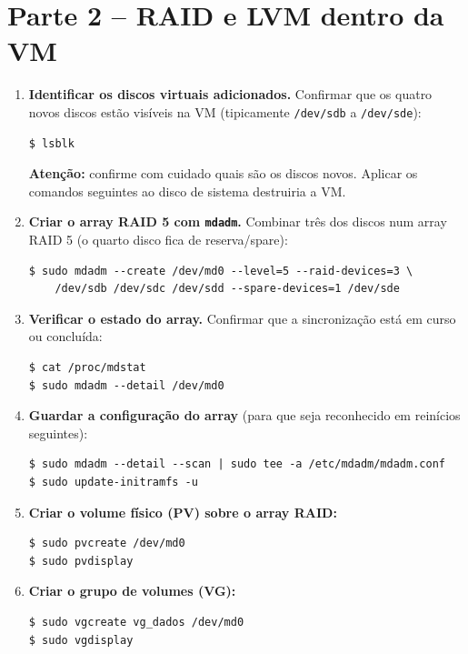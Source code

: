 \documentclass[11pt,a4paper]{article}
\begin{document}
\section{Parte 2 -- RAID e LVM dentro da VM}
\begin{enumerate}[label=\arabic*.,resume]

    \item \textbf{Identificar os discos virtuais adicionados.} Confirmar que os quatro novos discos estão visíveis na VM (tipicamente \texttt{/dev/sdb} a \texttt{/dev/sde}):
\begin{lstlisting}
$ lsblk
\end{lstlisting}
    \textbf{Atenção:} confirme com cuidado quais são os discos novos. Aplicar os comandos seguintes ao disco de sistema destruiria a VM.

    \item \textbf{Criar o array RAID 5 com \texttt{mdadm}.} Combinar três dos discos num array RAID 5 (o quarto disco fica de reserva/spare):
\begin{lstlisting}
$ sudo mdadm --create /dev/md0 --level=5 --raid-devices=3 \
    /dev/sdb /dev/sdc /dev/sdd --spare-devices=1 /dev/sde
\end{lstlisting}

    \item \textbf{Verificar o estado do array.} Confirmar que a sincronização está em curso ou concluída:
\begin{lstlisting}
$ cat /proc/mdstat
$ sudo mdadm --detail /dev/md0
\end{lstlisting}

    \item \textbf{Guardar a configuração do array} (para que seja reconhecido em reinícios seguintes):
\begin{lstlisting}
$ sudo mdadm --detail --scan | sudo tee -a /etc/mdadm/mdadm.conf
$ sudo update-initramfs -u
\end{lstlisting}

    \item \textbf{Criar o volume físico (PV) sobre o array RAID:}
\begin{lstlisting}
$ sudo pvcreate /dev/md0
$ sudo pvdisplay
\end{lstlisting}

    \item \textbf{Criar o grupo de volumes (VG):}
\begin{lstlisting}
$ sudo vgcreate vg_dados /dev/md0
$ sudo vgdisplay
\end{lstlisting}


\end{enumerate}
\end{document}
